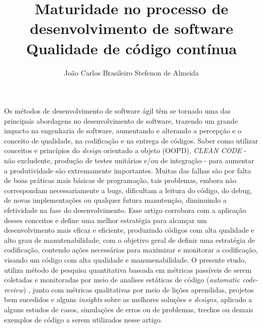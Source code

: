 \documentclass[12pt]{article}
\title{Maturidade no processo de desenvolvimento de software\\ Qualidade de código contínua }
\author{João Carlos Brasileiro Stefenon de Almeida\inst{1}}
\begin{document}
\maketitle


\begin{resumo}
Os métodos de desenvolvimento de software ágil têm se tornado uma das principais abordagens no desenvolvimento de software, trazendo um grande impacto na engenharia de software, aumentando e alterando a percepção e o conceito de qualidade, na codificação e na entrega de códigos.
Saber como utilizar conceitos e princípios do \textit{design} orientado a objeto (OOPD), \textit{CLEAN CODE} - não excludente, produção de testes unitários e/ou de integração - para aumentar a produtividade são extremamente importantes.
Muitas das falhas são por falta de boas práticas mais básicas de programação, tais problemas, embora não correspondam necessariamente a bugs, dificultam a leitura do código, do debug, de novas implementações ou qualquer futura manutenção, diminuindo a efetividade na fase do desenvolvimento.
Esse artigo corrobora com a aplicação desses conceitos e define uma melhor estratégia para alcançar um desenvolvimento mais eficaz e eficiente, produzindo códigos com alta qualidade e alto grau de manutenabilidade, com o objetivo geral de definir uma estratégia de codificação, contendo ações necessárias para maximizar e monitorar a codificação, visando um código com alta qualidade e manunenabilidade. O presente etudo, utiliza método de pesquisa quantitativa baseada em métricas passíveis de serem coletadas e monitoradas por meio de analises estáticas de código (\textit{automatic code-review}) , junto com métricas qualitativas por meio de lições aprendidas, projetos   bem sucedidos e alguns \textit{insights} sobre as melhores soluções e \textit{designs}, aplicado a alguns estudos de casos, simulações de erros ou de problemas, trechos ou demais exemplos de código a serem utilizados nesse artigo.
\end{resumo}
\end{document}
